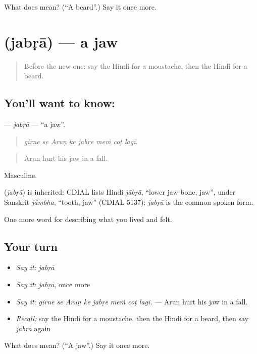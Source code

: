\begin{tcolorbox}[breakable,colback=teal!4,colframe=teal!35!black,title={Before you move on}]
What does  mean? (\textquotedblleft{}A beard\textquotedblright{}.) Say it once more.
\end{tcolorbox}
\section[\texorpdfstring{\hi{जबड़ा} (jabṛā)}{जबड़ा (jabṛā)}]{ (jabṛā) — a jaw}

\label{lesson:HI-C476-jabra}



\begin{quote}
Before the new one: say the Hindi for a moustache, then the Hindi for a beard.
\end{quote}

\subsection*{You'll want to know: }
\textbf{} — \emph{jabṛā} — \textquotedblleft{}a jaw\textquotedblright{}.

\begin{quote}
       
\end{quote}

\begin{quote}
\emph{girne se Aruṇ ke jabṛe meṁ coṭ lagī.}
\end{quote}

\begin{quote}
Arun hurt his jaw in a fall.
\end{quote}

Masculine.

\begin{cousinweb}
\textbf{} (\emph{jabṛā}) is inherited: CDIAL lists Hindi \emph{jābṛā}, \textquotedblleft{}lower jaw-bone, jaw\textquotedblright{}, under Sanskrit \emph{jámbha}, \textquotedblleft{}tooth, jaw\textquotedblright{} (CDIAL 5137); \emph{jabṛā} is the common spoken form.
\end{cousinweb}

\begin{grammarlens}[title={What you've built}]
One more word for describing what you lived and felt.
\end{grammarlens}

\subsection*{Your turn}
\begin{itemize}
\raggedright
  \item \emph{Say it:} \emph{jabṛā}
  \item \emph{Say it:} \emph{jabṛā}, once more
  \item \emph{Say it:} \emph{girne se Aruṇ ke jabṛe meṁ coṭ lagī.} — Arun hurt his jaw in a fall.
  \item \emph{Recall:} say the Hindi for a moustache, then the Hindi for a beard, then say \emph{jabṛā} again
\end{itemize}

\begin{tcolorbox}[breakable,colback=teal!4,colframe=teal!35!black,title={Before you move on}]
What does  mean? (\textquotedblleft{}A jaw\textquotedblright{}.) Say it once more.
\end{tcolorbox}
